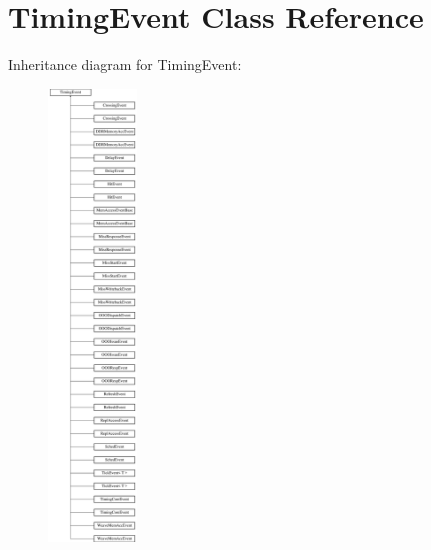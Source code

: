 \hypertarget{classTimingEvent}{\section{Timing\-Event Class Reference}
\label{classTimingEvent}
}
Inheritance diagram for Timing\-Event\-:\begin{figure}[H]
\begin{center}
\leavevmode
\includegraphics[height=12.000000cm]{classTimingEvent}
\end{center}
\end{figure}
